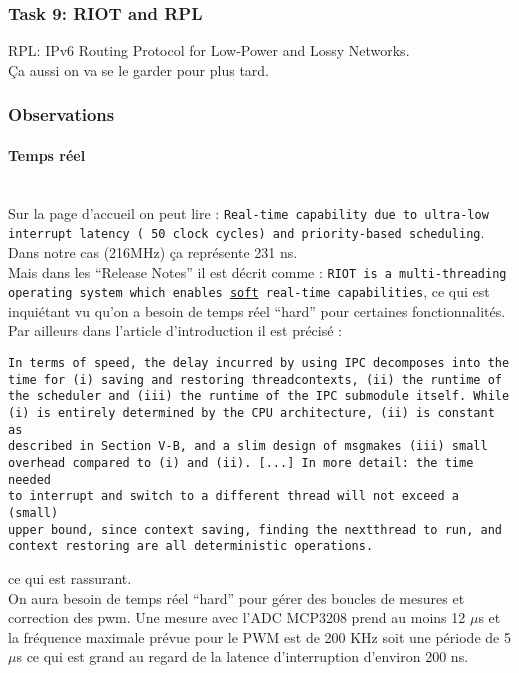 \subsubsection{Task 9: RIOT and RPL}
RPL: IPv6 Routing Protocol for Low-Power and Lossy Networks.\\
Ça aussi on va se le garder pour plus tard.

\subsubsection{Observations}
\paragraph{Temps réel}~\\

Sur la page d'accueil on peut lire : \texttt{Real-time capability due to
ultra-low interrupt latency (~50 clock cycles) and priority-based
scheduling}. Dans notre cas (216MHz) ça représente 231 ns.\\

Mais dans les \enquote{Release Notes} il est décrit comme : \texttt{RIOT
is a multi-threading operating system which enables \underline{soft}
real-time capabilities}, ce qui est inquiétant vu qu'on a besoin de
temps réel \enquote{hard} pour certaines fonctionnalités.\\

Par ailleurs dans l'article d'introduction \cite{ref10} il est précisé :
\begin{verbatim}
In terms of speed, the delay incurred by using IPC decomposes into the
time for (i) saving and restoring threadcontexts, (ii) the runtime of
the scheduler and (iii) the runtime of the IPC submodule itself. While
(i) is entirely determined by the CPU architecture, (ii) is constant as
described in Section V-B, and a slim design of msgmakes (iii) small
overhead compared to (i) and (ii). [...] In more detail: the time needed
to interrupt and switch to a different thread will not exceed a (small)
upper bound, since context saving, finding the nextthread to run, and
context restoring are all deterministic operations.
\end{verbatim}
ce qui est rassurant.\\

On aura besoin de temps réel \enquote{hard} pour gérer des boucles de
mesures et correction des pwm. Une mesure avec l'ADC MCP3208 prend au
moins 12 $\mu$s et la fréquence maximale prévue pour le PWM est de 200
KHz soit une période de 5 $\mu$s ce qui est grand au regard de la
latence d'interruption d'environ 200 ns.\\

